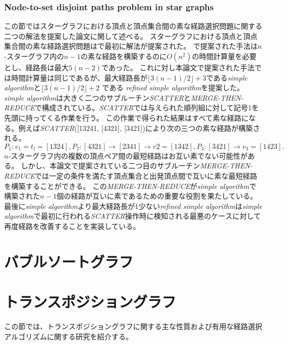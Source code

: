 \documentclass[11pt,a4j]{jsarticle}
\theoremstyle{plain}
\begin{document}
\subsubsection{Node-to-set disjoint paths problem in star graphs}
この節ではスターグラフにおける頂点と頂点集合間の素な経路選択問題に関する二つの解法を提案した論文\cite{star-n2s}に関して述べる。\newline
スターグラフにおける頂点と頂点集合間の素な経路選択問題は\cite{star-n2s-first}で最初に解法が提案された。
\cite{star-n2s-first}で提案された手法は$n$-スターグラフ内の$n-1$の素な経路を構築するのに$O(n^2)$の時間計算量を必要とし、経路長は最大$5(n-2)$であった。
これに対し本論文で提案された手法では時間計算量は同じであるが、最大経路長が$\lfloor3(n - 1) /2 \rfloor +3$である{\it simple algorithm}と$\lfloor3(n - 1) /2 \rfloor +2$ である
{\it refined simple algorithm}を提案した。{\it simple algorithm}は大きく二つのサブルーチン{\it SCATTER}と{\it MERGE-THEN-REDUCE}で構成されている。{\it SCATTER}では与えられた順列組に対して記号1を先頭に持ってくる作業を行う。
この作業で得られた結果はすべて素な経路になる。例えば{\it SCATTER}([13241, [4321], [3421])により次の三つの素な経路が構築される。$P_1 : v_1 = t_l = [1324], P_2 : [4321] \rightarrow  [2341] \rightarrow	 v2 = [1342], P_3 : [3421] \rightarrow v_3 = [1423].$\newline 
$n$-スターグラフ内の複数の頂点ペア間の最短経路はお互い素でない可能性がある。
しかし、本論文で提案されている二つ目のサブルーチン{\it MERGE-THEN-REDUCE}では一定の条件を満たす頂点集合と出発頂点間で互いに素な最短経路を構築することができる。
この{\it MERGE-THEN-REDUCE}が{\it simple algorithm}で構築された$n-1$個の経路が互いに素であるための重要な役割を果たしている。\newline
最後に{\it simple algorithm}より最大経路長が1少ない{\it refined simple algorithm}は{\it simple algorithm}で最初に行われる{\it SCATTER}操作時に検知される最悪のケースに対して再度経路を改善することを実装している。






\section{バブルソートグラフ}


\section{トランスポジショングラフ}
この節では、トランスポジショングラフに関する主な性質および有用な経路選択アルゴリズムに関する研究を紹介する。
\end{document}
